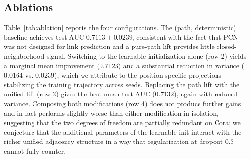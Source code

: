 \documentclass[letterpaper]{article} %
\begin{document}
\subsection{Ablations} \label{subsec:ablations}

\begin{table}[t]
\centering
{}
\caption{Cora link-prediction ROC-AUC (mean \(\pm\) standard deviation over 10 seeds). Rows correspond to the four configurations obtained by crossing the lift (path vs. unified path\,+\,cellular) with the cell-feature initialization (deterministic scatter-sum vs. position-aware learnable). Bold text indicates the best result in each column.}
\label{tab:ablation}
\end{table}

Table~\ref{tab:ablation} reports the four configurations. The (path, deterministic) baseline achieves test AUC \(0.7113 \pm 0.0239\), consistent with the fact that PCN was not designed for link prediction and a pure-path lift provides little closed-neighborhood signal. Switching to the learnable initialization alone (row 2) yields a marginal mean improvement (\(0.7123\)) and a substantial reduction in variance (\(0.0164\) vs. \(0.0239\)), which we attribute to the position-specific projections stabilizing the training trajectory across seeds. Replacing the path lift with the unified lift (row 3) gives the best mean test AUC (\(0.7132\)), again with reduced variance. Composing both modifications (row 4) does not produce further gains and in fact performs slightly worse than either modification in isolation, suggesting that the two degrees of freedom are partially redundant on Cora; we conjecture that the additional parameters of the learnable init interact with the richer unified adjacency structure in a way that regularization at dropout \(0.3\) cannot fully counter.
\end{document}
